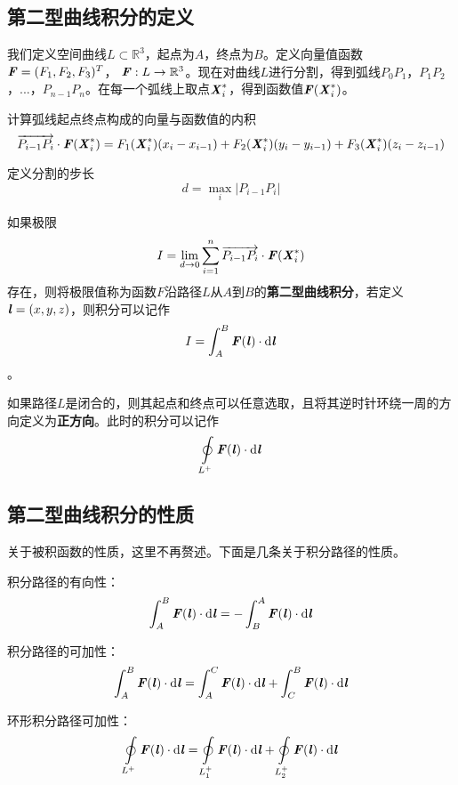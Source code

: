 \documentclass[UTF8,openany]{book}
\begin{document}
\subsection{第二型曲线积分的定义}
	我们定义空间曲线$L\subset\mathbb{R}^3$，起点为$A$，终点为$B$。定义向量值函数$\textbf{\textit{F}}=(F_1,F_2,F_3)^{T}$，
	$\textbf{\textit{F}}:L\rightarrow\mathbb{R}^3$。现在对曲线$L$进行分割，得到弧线$P_0P_1$，$P_1P_2$，...，$P_{n-1}P_{n}$。在每一个弧线上取点$\textbf{\textit{X}}_i^*$，得到函数值$\textbf{\textit{F}}(\textbf{\textit{X}}_i^*)$。\par
	计算弧线起点终点构成的向量与函数值的内积
	$$\overrightarrow{P_{i-1}P_{i}}\cdot\textbf{\textit{F}}(\textbf{\textit{X}}_i^*)=
	F_1(\textbf{\textit{X}}_i^*)(x_i-x_{i-1})+F_2(\textbf{\textit{X}}_i^*)(y_i-y_{i-1})+
	F_3(\textbf{\textit{X}}_i^*)(z_i-z_{i-1})$$\par
	定义分割的步长
	$$d=\max_{i}|P_{i-1}P_{i}|$$\par
	如果极限
	$$I=\lim_{d\rightarrow 0}\sum_{i=1}^{n}\overrightarrow{P_{i-1}P_{i}}\cdot\textbf{\textit{F}}(\textbf{\textit{X}}_i^*)$$
	存在，则将极限值称为函数$F$沿路径$L$从$A$到$B$的\textbf{第二型曲线积分}，若定义$\textbf{\textit{l}}=(x,y,z)$，则积分可以记作
	$$I=\int_{A}^{B}\textbf{\textit{F}}(\textbf{\textit{l}})\cdot\mathrm{d}\textbf{\textit{l}}$$。\par
	如果路径$L$是闭合的，则其起点和终点可以任意选取，且将其逆时针环绕一周的方向定义为\textbf{正方向}。此时的积分可以记作
	$$\oint\limits_{L^{+}}\textbf{\textit{F}}(\textbf{\textit{l}})\cdot\mathrm{d}\textbf{\textit{l}}$$
	\subsection{第二型曲线积分的性质}
	关于被积函数的性质，这里不再赘述。下面是几条关于积分路径的性质。\par
	积分路径的有向性：
	$$\int_{A}^{B}\textbf{\textit{F}}(\textbf{\textit{l}})\cdot\mathrm{d}\textbf{\textit{l}}=
	-\int_{B}^{A}\textbf{\textit{F}}(\textbf{\textit{l}})\cdot\mathrm{d}\textbf{\textit{l}}$$\par
	积分路径的可加性：
	$$\int_{A}^{B}\textbf{\textit{F}}(\textbf{\textit{l}})\cdot\mathrm{d}\textbf{\textit{l}}=
	\int_{A}^{C}\textbf{\textit{F}}(\textbf{\textit{l}})\cdot\mathrm{d}\textbf{\textit{l}}+
	\int_{C}^{B}\textbf{\textit{F}}(\textbf{\textit{l}})\cdot\mathrm{d}\textbf{\textit{l}}$$\par
	环形积分路径可加性：
	$$\oint\limits_{L^+}\textbf{\textit{F}}(\textbf{\textit{l}})\cdot\mathrm{d}\textbf{\textit{l}}=
	\oint\limits_{L_1^+}\textbf{\textit{F}}(\textbf{\textit{l}})\cdot\mathrm{d}\textbf{\textit{l}}+
	\oint\limits_{L_2^+}\textbf{\textit{F}}(\textbf{\textit{l}})\cdot\mathrm{d}\textbf{\textit{l}}$$
\end{document}

